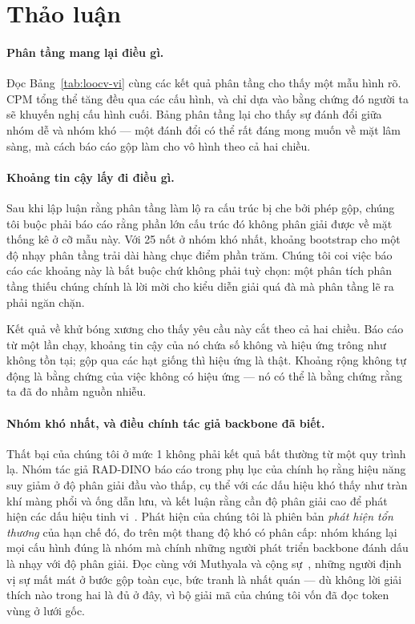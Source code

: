 \documentclass[12pt,a4paper]{article}
\begin{document}
\section{Thảo luận}

\paragraph{Phân tầng mang lại điều gì.}
Đọc Bảng~\ref{tab:loocv-vi} cùng các kết quả phân tầng cho thấy một mẫu hình rõ.
CPM tổng thể tăng đều qua các cấu hình, và chỉ dựa vào bằng chứng đó người ta sẽ
khuyến nghị cấu hình cuối. Bảng phân tầng lại cho thấy sự đánh đổi giữa nhóm dễ
và nhóm khó --- một đánh đổi có thể rất đáng mong muốn về mặt lâm sàng, mà cách
báo cáo gộp làm cho vô hình theo cả hai chiều.

\paragraph{Khoảng tin cậy lấy đi điều gì.}
Sau khi lập luận rằng phân tầng làm lộ ra cấu trúc bị che bởi phép gộp, chúng tôi
buộc phải báo cáo rằng phần lớn cấu trúc đó không phân giải được về mặt thống kê ở
cỡ mẫu này. Với 25 nốt ở nhóm khó nhất, khoảng bootstrap cho một độ nhạy phân
tầng trải dài hàng chục điểm phần trăm. Chúng tôi coi việc báo cáo các khoảng này
là bắt buộc chứ không phải tuỳ chọn: một phân tích phân tầng thiếu chúng chính là
lời mời cho kiểu diễn giải quá đà mà phân tầng lẽ ra phải ngăn chặn.

Kết quả về khử bóng xương cho thấy yêu cầu này cắt theo cả hai chiều. Báo cáo từ
một lần chạy, khoảng tin cậy của nó chứa số không và hiệu ứng trông như không tồn
tại; gộp qua các hạt giống thì hiệu ứng là thật. Khoảng rộng không tự động là
bằng chứng của việc không có hiệu ứng --- nó có thể là bằng chứng rằng ta đã đo
nhầm nguồn nhiễu.

\paragraph{Nhóm khó nhất, và điều chính tác giả backbone đã biết.}
Thất bại của chúng tôi ở mức 1 không phải kết quả bất thường từ một quy trình lạ.
Nhóm tác giả RAD-DINO báo cáo trong phụ lục của chính họ rằng hiệu năng suy giảm
ở độ phân giải đầu vào thấp, cụ thể với các dấu hiệu khó thấy như tràn khí màng
phổi và ống dẫn lưu, và kết luận rằng cần độ phân giải cao để phát hiện các dấu
hiệu tinh vi~\cite{perezgarcia2024raddino}. Phát hiện của chúng tôi là phiên bản
\emph{phát hiện tổn thương} của hạn chế đó, đo trên một thang độ khó có phân cấp:
nhóm kháng lại mọi cấu hình đúng là nhóm mà chính những người phát triển backbone
đánh dấu là nhạy với độ phân giải. Đọc cùng với Muthyala và cộng
sự~\cite{muthyala2026frozen}, những người định vị sự mất mát ở bước gộp toàn cục,
bức tranh là nhất quán --- dù không lời giải thích nào trong hai là đủ ở đây, vì
bộ giải mã của chúng tôi vốn đã đọc token vùng ở lưới gốc.
\end{document}

